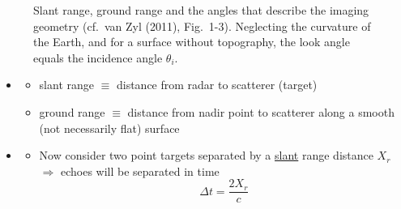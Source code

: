 \documentclass[11pt, oneside]{article}
\begin{document}
\begin{figure}[!htbp]
	\caption{Slant range, ground range and the angles that describe the imaging geometry (cf.\ van Zyl (2011), Fig.~1-3). Neglecting the curvature of the Earth, and for a surface without topography, the look angle equals the incidence angle $\theta_i$.}
	\label{f:angles}
\end{figure}

\begin{itemize}
	\item[] \begin{itemize}
		\item slant range $\equiv$ distance from radar to scatterer (target)
		\item ground range $\equiv$ distance from nadir point to scatterer along a smooth (not necessarily flat) surface
	\end{itemize}
	\item[] \begin{itemize}
		\item[--] Now consider two point targets separated by a \underline{slant} range distance $X_r$ $\Rightarrow$ echoes will be separated in time
		\begin{equation}
			\label{e:dt}
			\Delta t = \frac{2X_r}{c}
		\end{equation}
	\end{itemize}
\end{itemize}
\end{document}
